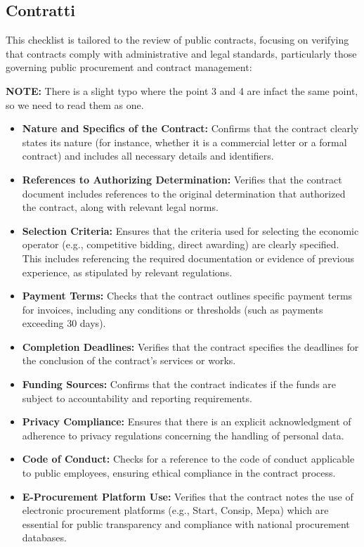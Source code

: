 \documentclass[../main.tex]{subfiles}
\begin{document}
\subsection{Contratti}
This checklist is tailored to the review of public contracts, focusing on verifying that contracts comply with administrative and legal standards, particularly those governing public procurement and contract management:

\textbf{NOTE:} There is a slight typo where the point 3 and 4 are infact the same point, so we need to read them as one.

\begin{itemize}
    \item \textbf{Nature and Specifics of the Contract:}
 Confirms that the contract clearly states its nature (for instance, whether it is a commercial letter or a formal contract) and includes all necessary details and identifiers.
    \item \textbf{References to Authorizing Determination:}
 Verifies that the contract document includes references to the original determination that authorized the contract, along with relevant legal norms.
    \item \textbf{Selection Criteria:}
 Ensures that the criteria used for selecting the economic operator (e.g., competitive bidding, direct awarding) are clearly specified. This includes referencing the required documentation or evidence of previous experience, as stipulated by relevant regulations.
    \item \textbf{Payment Terms:}
 Checks that the contract outlines specific payment terms for invoices, including any conditions or thresholds (such as payments exceeding 30 days).
    \item \textbf{Completion Deadlines:}
 Verifies that the contract specifies the deadlines for the conclusion of the contract’s services or works.
    \item \textbf{Funding Sources:}
 Confirms that the contract indicates if the funds are subject to accountability and reporting requirements.
    \item \textbf{Privacy Compliance:}
 Ensures that there is an explicit acknowledgment of adherence to privacy regulations concerning the handling of personal data.
    \item \textbf{Code of Conduct:}
 Checks for a reference to the code of conduct applicable to public employees, ensuring ethical compliance in the contract process.
    \item \textbf{E-Procurement Platform Use:}
 Verifies that the contract notes the use of electronic procurement platforms (e.g., Start, Consip, Mepa) which are essential for public transparency and compliance with national procurement databases.
\end{itemize}


 
\end{document}
